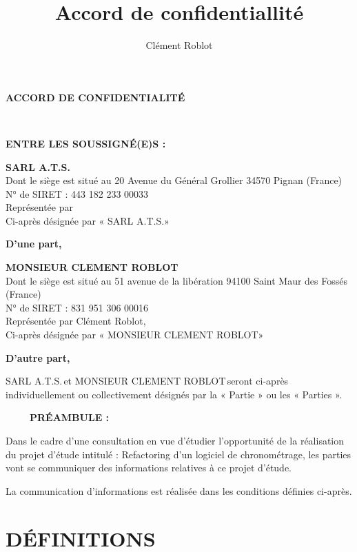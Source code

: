 \documentclass[]{karlito}
\title{Accord de confidentiallité}
\author{Clément Roblot}
\newcommand{\conditionnalForm}[2]{\ifthenelse{\equal{#1}{}}{\TextField[#2]{}}{#1}}
\newcommand{\projectName}{Refactoring d'un logiciel de chronométrage}
\newcommand{\nameBeneficiaryCompanie}{MONSIEUR CLEMENT ROBLOT}
\newcommand{\nameBeneficiaryPerson}{Clément Roblot}
\newcommand{\addressBeneficiary}{51 avenue de la libération 94100 Saint Maur des Fossés (France)}
\newcommand{\siretBeneficiary}{831 951 306 00016}
\newcommand{\nameIssuingCompanie}{SARL A.T.S.}
\newcommand{\nameIssuingPerson}{}
\newcommand{\addressIssuing}{20 Avenue du Général Grollier 34570 Pignan (France)}
\newcommand{\siretIssuing}{443 182 233 00033}
\begin{document}
\begin{center}
\textbf{ACCORD DE CONFIDENTIALITÉ}
\end{center}

~\newline
~\newline

\textbf{ENTRE LES SOUSSIGNÉ(E)S :}
~\newline

\textbf{\nameIssuingCompanie}\\
Dont le siège est situé au \addressIssuing\\
N° de SIRET : \siretIssuing\\
Représentée par \conditionnalForm{\nameIssuingPerson}{name=nameIssuingPerson,width=12cm}\\
Ci-après désignée par « \nameIssuingCompanie »

\begin{flushright}\textbf{D’une part,}\end{flushright}

\textbf{\nameBeneficiaryCompanie}\\
Dont le siège est situé au \addressBeneficiary\\
N° de SIRET : \siretBeneficiary\\
Représentée par \nameBeneficiaryPerson,\\
Ci-après désignée par « \nameBeneficiaryCompanie »

\begin{flushright}\textbf{D’autre part,}\end{flushright}


\nameIssuingCompanie\,et \nameBeneficiaryCompanie\,seront ci-après individuellement ou collectivement désignés par la « Partie » ou les « Parties ».

~\newline
~\newline
~\newline
\textbf{PRÉAMBULE :}
~\newline

Dans le cadre d’une consultation en vue d’étudier l’opportunité de la réalisation du projet d’étude intitulé : \projectName, les parties vont se communiquer des informations relatives à ce projet d’étude.

La communication d’informations est réalisée dans les conditions définies ci-après.



\newpage
\chapter{DÉFINITIONS}
\end{document}
